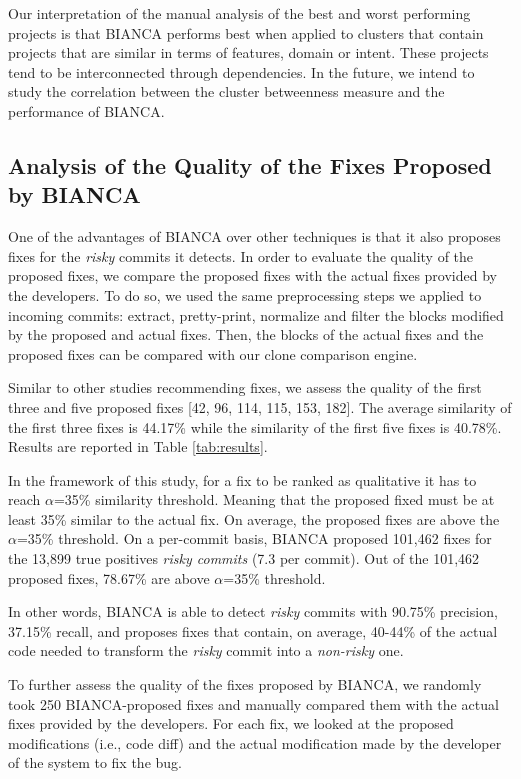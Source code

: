 \documentclass[12pt]{report}
\begin{document}
Our interpretation of the manual analysis of the best and worst
performing projects is that BIANCA performs best when applied to
clusters that contain projects that are similar in terms of features,
domain or intent. These projects tend to be interconnected through
dependencies. In the future, we intend to study the correlation between
the cluster betweenness measure and the performance of BIANCA.

\subsection{Analysis of the Quality of the Fixes Proposed by
BIANCA}\label{analysis-of-the-quality-of-the-fixes-proposed-by-bianca}

One of the advantages of BIANCA over other techniques is that it also
proposes fixes for the \emph{risky} commits it detects. In order to
evaluate the quality of the proposed fixes, we compare the proposed
fixes with the actual fixes provided by the developers. To do so, we
used the same preprocessing steps we applied to incoming commits:
extract, pretty-print, normalize and filter the blocks modified by the
proposed and actual fixes. Then, the blocks of the actual fixes and the
proposed fixes can be compared with our clone comparison engine.

Similar to other studies recommending fixes, we assess the quality of
the first three and five proposed fixes {[}42, 96, 114, 115, 153,
182{]}. The average similarity of the first three fixes is 44.17\% while
the similarity of the first five fixes is 40.78\%. Results are reported
in Table \ref{tab:results}.

In the framework of this study, for a fix to be ranked as qualitative it
has to reach \(\alpha\)=35\% similarity threshold. Meaning that the
proposed fixed must be at least 35\% similar to the actual fix. On
average, the proposed fixes are above the \(\alpha\)=35\% threshold. On
a per-commit basis, BIANCA proposed 101,462 fixes for the 13,899 true
positives \emph{risky commits} (7.3 per commit). Out of the 101,462
proposed fixes, 78.67\% are above \(\alpha\)=35\% threshold.

In other words, BIANCA is able to detect \emph{risky} commits with
90.75\% precision, 37.15\% recall, and proposes fixes that contain, on
average, 40-44\% of the actual code needed to transform the \emph{risky}
commit into a \emph{non-risky} one.

To further assess the quality of the fixes proposed by BIANCA, we
randomly took 250 BIANCA-proposed fixes and manually compared them with
the actual fixes provided by the developers. For each fix, we looked at
the proposed modifications (i.e., code diff) and the actual modification
made by the developer of the system to fix the bug.
\end{document}
